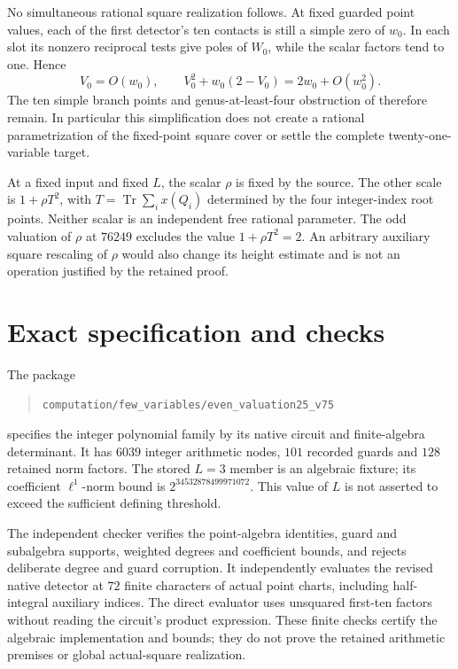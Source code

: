 \documentclass[11pt,a4paper]{article}
\newcommand{\Tr}{\operatorname{Tr}}
\begin{document}
No simultaneous rational square realization follows. At fixed
guarded point values, each of the first detector's ten contacts
is still a simple zero of $w_0$. In each slot its nonzero
reciprocal tests give poles of $W_0$, while the scalar factors tend
to one. Hence
\[
 V_0=O(w_0),\qquad
 V_0^2+w_0(2-V_0)=2w_0+O(w_0^2).
\]
The ten simple branch points and genus-at-least-four obstruction
of \cite{Obstruction} therefore remain. In particular this
simplification does not create a rational parametrization of the
fixed-point square cover or settle the complete twenty-one-variable
target.

At a fixed input and fixed $L$, the scalar $\rho$ is fixed by the
source. The other scale is $1+\rho T^2$, with
$T=\Tr\sum_i x(Q_i)$ determined by the four integer-index root
points. Neither scalar is an independent free rational parameter.
The odd valuation of $\rho$ at $76249$ excludes the value
$1+\rho T^2=2$. An arbitrary auxiliary square rescaling of $\rho$
would also change its height estimate and is not an operation
justified by the retained proof.

\section{Exact specification and checks}

The package
\begin{quote}\small
\nolinkurl{computation/few_variables/even_valuation25_v75}
\end{quote}
specifies the integer polynomial family by its native circuit and
finite-algebra determinant. It has $6039$ integer arithmetic nodes,
$101$ recorded guards and $128$ retained norm factors. The stored
$L=3$ member is an algebraic fixture; its coefficient $\ell^1$-norm
bound is $2^{34532878499971072}$. This value of $L$ is not
asserted to exceed the sufficient defining threshold.

The independent checker verifies the point-algebra identities,
guard and subalgebra supports, weighted degrees and coefficient
bounds, and rejects deliberate degree and guard corruption. It
independently evaluates the revised native detector at $72$ finite
characters of actual point charts, including half-integral auxiliary
indices. The direct evaluator uses unsquared first-ten factors
without reading the circuit's product expression. These finite
checks certify the algebraic implementation and bounds; they do
not prove the retained arithmetic premises or global actual-square
realization.
\end{document}
